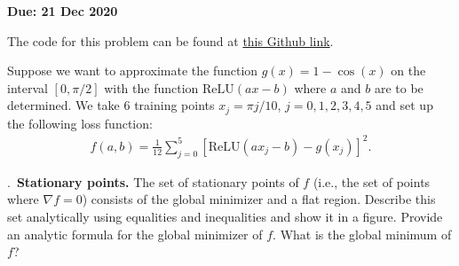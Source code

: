 \documentclass{letter}
\newcounter{problem}
\newcommand{\Problem}[2]{%
	\stepcounter{problem}%
	\leftskip=0pt%
	\theproblem.~\textbf{{#1.}} #2 \par%
}
\newcommand{\Due}[1]{\textbf{Due: #1} \par}
\newcommand{\relu}{\mathrm{ReLU}}
\begin{document}
    \Due{21 Dec 2020}

    The code for this problem can be found at \href{https://github.com/thoffman1/amsc808n/tree/master/final/problem1}{this Github link}.

    Suppose we want to approximate the function $g(x) = 1 - \cos(x)$ on the interval $[0, \pi/2]$ with the function $\relu(ax - b)$ where $a$ and $b$ are to be determined. We take 6 training points $x_j = \pi j/10$, $j = 0,1,2,3,4,5$ and set up the following loss function: \begin{align*}
        f(a, b) = \frac{1}{12}\sum_{j = 0}^5 [\relu(ax_j - b) - g(x_j)]^2.
    \end{align*}

    \Problem{Stationary points}{The set of stationary points of $f$ (i.e., the set of points where $\nabla f = 0$) consists of the global minimizer and a flat region. Describe this set analytically using equalities and inequalities and show it in a figure. Provide an analytic formula for the global minimizer of $f$. What is the global minimum of $f$?}
\end{document}
